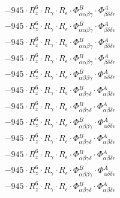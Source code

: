 \documentclass{article}
\begin{document}
\begin{subequations}
\begin{gather}
\begin{array}{c}
 \\[0.2em] 		 - 945 \cdot R_{z}^{6} \cdot R_{\gamma{}} \cdot R_{\epsilon{}} \cdot \Phi{}^{B}_{\alpha{}\alpha{}\beta{}\gamma{}} \cdot \Phi{}^{A}_{\beta{}\delta{}\delta{}\epsilon{}} 
 \\[0.2em] 		 - 945 \cdot R_{z}^{6} \cdot R_{\gamma{}} \cdot R_{\epsilon{}} \cdot \Phi{}^{B}_{\alpha{}\alpha{}\beta{}\gamma{}} \cdot \Phi{}^{A}_{\beta{}\delta{}\delta{}\epsilon{}} 
 \\[0.2em] 		 - 945 \cdot R_{z}^{6} \cdot R_{\gamma{}} \cdot R_{\epsilon{}} \cdot \Phi{}^{B}_{\alpha{}\alpha{}\beta{}\gamma{}} \cdot \Phi{}^{A}_{\beta{}\delta{}\delta{}\epsilon{}} 
 \\[0.2em] 		 - 945 \cdot R_{z}^{6} \cdot R_{\gamma{}} \cdot R_{\epsilon{}} \cdot \Phi{}^{B}_{\alpha{}\alpha{}\beta{}\gamma{}} \cdot \Phi{}^{A}_{\beta{}\delta{}\delta{}\epsilon{}} 
 \\[0.2em] 		 - 945 \cdot R_{z}^{6} \cdot R_{\gamma{}} \cdot R_{\epsilon{}} \cdot \Phi{}^{B}_{\alpha{}\beta{}\beta{}\gamma{}} \cdot \Phi{}^{A}_{\alpha{}\delta{}\delta{}\epsilon{}} 
 \\[0.2em] 		 - 945 \cdot R_{z}^{6} \cdot R_{\gamma{}} \cdot R_{\epsilon{}} \cdot \Phi{}^{B}_{\alpha{}\beta{}\gamma{}\delta{}} \cdot \Phi{}^{A}_{\alpha{}\beta{}\delta{}\epsilon{}} 
 \\[0.2em] 		 - 945 \cdot R_{z}^{6} \cdot R_{\gamma{}} \cdot R_{\epsilon{}} \cdot \Phi{}^{B}_{\alpha{}\beta{}\gamma{}\delta{}} \cdot \Phi{}^{A}_{\alpha{}\beta{}\delta{}\epsilon{}} 
 \\[0.2em] 		 - 945 \cdot R_{z}^{6} \cdot R_{\gamma{}} \cdot R_{\epsilon{}} \cdot \Phi{}^{B}_{\alpha{}\beta{}\beta{}\gamma{}} \cdot \Phi{}^{A}_{\alpha{}\delta{}\delta{}\epsilon{}} 
 \\[0.2em] 		 - 945 \cdot R_{z}^{6} \cdot R_{\gamma{}} \cdot R_{\epsilon{}} \cdot \Phi{}^{B}_{\alpha{}\beta{}\gamma{}\delta{}} \cdot \Phi{}^{A}_{\alpha{}\beta{}\delta{}\epsilon{}} 
 \\[0.2em] 		 - 945 \cdot R_{z}^{6} \cdot R_{\gamma{}} \cdot R_{\epsilon{}} \cdot \Phi{}^{B}_{\alpha{}\beta{}\gamma{}\delta{}} \cdot \Phi{}^{A}_{\alpha{}\beta{}\delta{}\epsilon{}} 
 \\[0.2em] 		 - 945 \cdot R_{z}^{6} \cdot R_{\gamma{}} \cdot R_{\epsilon{}} \cdot \Phi{}^{B}_{\alpha{}\beta{}\beta{}\gamma{}} \cdot \Phi{}^{A}_{\alpha{}\delta{}\delta{}\epsilon{}} 
 \\[0.2em] 		 - 945 \cdot R_{z}^{6} \cdot R_{\gamma{}} \cdot R_{\epsilon{}} \cdot \Phi{}^{B}_{\alpha{}\beta{}\gamma{}\delta{}} \cdot \Phi{}^{A}_{\alpha{}\beta{}\delta{}\epsilon{}} 

\end{array}
\end{gather}
\end{subequations}
\end{document}

